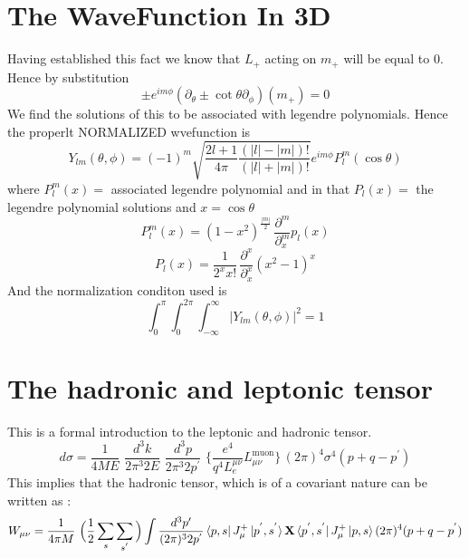 \documentclass{article}
\begin{document}
\section{The WaveFunction In 3D}
Having established this fact we know that $L_+$ acting on $m_+$ will be equal to $0$. Hence by substitution 
\begin{equation}
{\pm}e^{im\phi}(\partial_\theta \pm \cot{\theta}\partial_{\phi})(m_+)=0
\end{equation}
We find the solutions of this to be associated with legendre polynomials. Hence the properlt NORMALIZED wvefunction is 
\begin{equation}
Y_{lm}(\theta,\phi)=(-1)^m \sqrt{\frac{2l+1}{4\pi} \frac{(|l|-|m|)!}{(|l|+|m|)!}}e^{im\phi}P_l^m(\cos{\theta}) 
\end{equation}
where $P_l^m(x)=$ associated legendre polynomial and in that $P_l(x)=$ the legendre polynomial solutions and $x=\cos{\theta}$
\begin{equation}
P_l^m(x)=(1-x^2)^{\frac{|m|}{2}}\,\frac{\partial^m}{\partial_x^m}p_l(x) 
\end{equation}
\begin{equation}
P_l(x)=\frac{1}{2^x x!}\, \frac{\partial^x}{\partial_x^x}(x^2-1)^x
\end{equation}
And the normalization conditon used is 
\begin{equation}
\int_{0}^{\pi}\int_{0}^{2\pi}\int_{-\infty}^{\infty}{|Y_{lm}(\theta,\phi)|^2}= 1
\end{equation}
\section{The hadronic and leptonic tensor}
This is a formal introduction to the leptonic and hadronic tensor. 
\begin{equation}
d\sigma = \frac{1}{4ME}\,\, \frac{d^3 k}{2\pi^{3} 2E}\,\, \frac{d^{3} p }{2\pi^{3}2p^{'}}\,\,\bigg\{\frac{e^{4}}{q^{4}L_{e}^{\mu \nu}} L_{\mu \nu}^{\text{muon}}\bigg\}\, (2\pi)^{4} \sigma^{4} (p+q-p^{'})
\end{equation}
This implies that the hadronic tensor, which is of a covariant nature can be written as : 
\begin{equation*}
W_{\mu \nu}= \frac{1}{4\pi M}\,\, \Big( \frac{1}{2} \sum_{s} \sum_{s^{'}} \Big) \int{\frac{d^{3}p{'}}{(2\pi)^{3} 2p^{'}} \bra{p,s}J_{\mu}^{+}\ket{p^{'},s^{'}} \\
 \textbf{X} \bra{p^{'},s^{'}}J_{\mu}^{+}\ket{p,s} (2\pi)^{4}(p+q-p^{'})}
\end{equation*}
\end{document}

